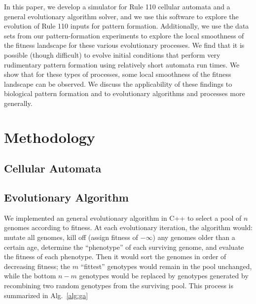 \documentclass[twocolumn]{article}
\newcommand{\alg}[1]{Alg.~#1}
\begin{document}
In this paper, we develop a simulator for Rule 110 cellular automata and a general evolutionary algorithm solver, and we use this software to explore the evolution of Rule 110 inputs for pattern formation. Additionally, we use the data sets from our pattern-formation experiments to explore the local smoothness of the fitness landscape for these various evolutionary processes. We find that it is possible (though difficult) to evolve initial conditions that perform very rudimentary pattern formation using relatively short automata run times. We show that for these types of processes, some local smoothness of the fitness landscape can be observed. We discuss the applicability of these findings to biological pattern formation and to evolutionary algorithms and processes more generally.

\section{Methodology}

\subsection{Cellular Automata}

\subsection{Evolutionary Algorithm}
We implemented an general evolutionary algorithm in C++ to select a pool of $n$ genomes according to fitness.  At each evolutionary iteration, the algorithm would: mutate all genomes, kill off (assign fitness of $-\infty$) any genomes older than a certain age, determine the ``phenotype'' of each surviving genome, and evaluate the fitness of each phenotype. Then it would sort the genomes in order of decreasing fitness; the $m$ ``fittest'' genotypes would remain in the pool unchanged, while the bottom $n-m$ genotypes would be replaced by genotypes generated by recombining two random genotypes from the surviving pool. This process is summarized in \alg{\ref{alg:ga}}
\end{document}
